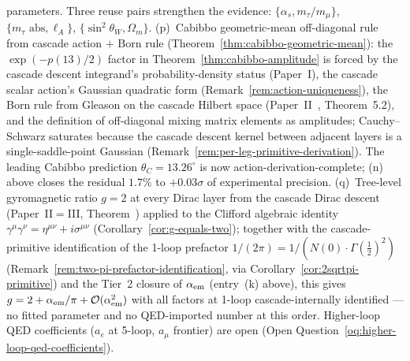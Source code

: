 \documentclass[12pt,a4paper]{article}
\begin{document}
parameters. Three reuse pairs strengthen the evidence: $\{\alpha_s,m_\tau/m_\mu\}$, $\{m_\tau\text{ abs},\ell_A\}$, $\{\sin^2\theta_W,\Omega_m\}$. (p)~Cabibbo geometric-mean off-diagonal rule from cascade action $+$ Born rule (Theorem~\ref{thm:cabibbo-geometric-mean}): the $\exp(-p(13)/2)$ factor in Theorem~\ref{thm:cabibbo-amplitude} is forced by the cascade descent integrand's probability-density status (Paper~I), the cascade scalar action's Gaussian quadratic form (Remark~\ref{rem:action-uniqueness}), the Born rule from Gleason on the cascade Hilbert space (Paper~II~\cite{part2}, Theorem~5.2), and the definition of off-diagonal mixing matrix elements as amplitudes; Cauchy--Schwarz saturates because the cascade descent kernel between adjacent layers is a single-saddle-point Gaussian (Remark~\ref{rem:per-leg-primitive-derivation}). The leading Cabibbo prediction $\theta_C=13.26^\circ$ is now action-derivation-complete; (n) above closes the residual $1.7\%$ to $+0.03\sigma$ of experimental precision. (q)~Tree-level gyromagnetic ratio $g=2$ at every Dirac layer from the cascade Dirac descent (Paper~II$=$III, Theorem~) applied to the Clifford algebraic identity $\gamma^\mu\gamma^\nu=\eta^{\mu\nu}+i\sigma^{\mu\nu}$ (Corollary~\ref{cor:g-equals-two}); together with the cascade-primitive identification of the 1-loop prefactor $1/(2\pi) = 1/(N(0)\cdot\Gamma(\tfrac{1}{2})^2)$ (Remark~\ref{rem:two-pi-prefactor-identification}, via Corollary~\ref{cor:2sqrtpi-primitive}) and the Tier~2 closure of $\alpha_{\rm em}$ (entry~(k) above), this gives $g=2+\alpha_{\rm em}/\pi+\mathcal{O}(\alpha_{\rm em}^2)$ with all factors at 1-loop cascade-internally identified --- no fitted parameter and no QED-imported number at this order. Higher-loop QED coefficients ($a_e$ at 5-loop, $a_\mu$ frontier) are open (Open Question~\ref{oq:higher-loop-qed-coefficients}).
\end{document}
